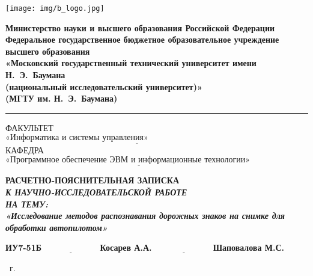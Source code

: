 \begin{titlepage}
	\fontsize{12pt}{12pt}\selectfont
	\noindent \begin{minipage}{0.15\textwidth}
		\texttt{[image: img/b\_logo.jpg]}
	\end{minipage}
	\noindent\begin{minipage}{0.85\textwidth}\centering
		\textbf{Министерство науки и высшего образования Российской Федерации}\\
		\textbf{Федеральное государственное бюджетное образовательное учреждение высшего образования}\\
		\textbf{«Московский государственный технический университет имени Н.~Э.~Баумана}\\
		\textbf{(национальный исследовательский университет)»}\\
		\textbf{(МГТУ им. Н.~Э.~Баумана)}
	\end{minipage}
	
	\noindent\rule{17cm}{3pt}
	\newline\newline
	\noindent ФАКУЛЬТЕТ $\underline{\text{«Информатика и системы управления»~~~~~~~~~~~~~~~~~~~~~~~~~~~~~~~~~~~~~~~~~~~}}$ \newline\newline
	\noindent КАФЕДРА $\underline{\text{«Программное обеспечение ЭВМ и информационные технологии»~~~~~~~~}}$\newline\newline\newline\newline\newline
	
	
	\begin{center}
		\Large\textbf{РАСЧЕТНО-ПОЯСНИТЕЛЬНАЯ ЗАПИСКА}\\
		\large\textit{\textbf{К НАУЧНО-ИССЛЕДОВАТЕЛЬСКОЙ РАБОТЕ}}\\
            \large\textbf{\textit{НА ТЕМУ:}}\\
            \textbf{\textit{«Исследование методов распознавания дорожных знаков на снимке для обработки автопилотом»}}
	\end{center}\vspace{2cm}

	
	\hspace{1cm}\textbf{ИУ7-51Б}\hfill$\underline{\text{~~~~~~~~~~~~~~~~~~~~~}}$\>\textbf{Косарев А.А.}\>\>\>\>\>\>\newline\newline
	\hspace{1cm}\hfill$\underline{\text{~~~~~~~~~~~~~~~~~~~~~}}$\>\textbf{Шаповалова М.С.}\newline\newline
	
	\begin{center}
		\vfill
		\the\year
		~г.
	\end{center}
\end{titlepage}
